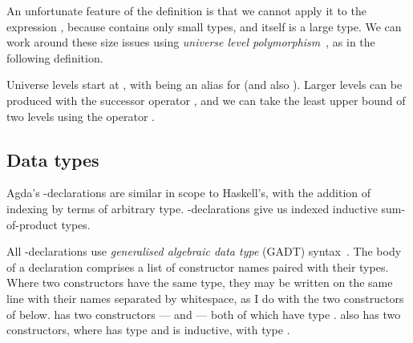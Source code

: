 
An unfortunate feature of the definition  is that we cannot
apply it to the expression , because 
contains only small types, and itself is a large type.
We can work around these size issues using
\emph{universe level polymorphism}~\citep{BCDE22},
as in the following definition.


Universe levels start at , with  being
an alias for \AgdaSpace{} (and also
).
Larger levels can be produced with the successor operator ,
and we can take the least upper bound of two levels using the operator
\AgdaPrimitive{\_$\sqcup$\_}.

\subsection{Data types}

Agda's -declarations are similar in scope to Haskell's, with
the addition of indexing by terms of arbitrary type.
-declarations give us indexed inductive sum-of-product types.

All -declarations use \emph{generalised algebraic data type}
(GADT) syntax~\citep{CH03,SP08,XCC03}.
The body of a declaration comprises a list of constructor names paired with
their types.
Where two constructors have the same type, they may be written on the same line
with their names separated by whitespace, as I do with the two constructors of
 below.
 has two constructors ---  and
 --- both of which have type
.
 also has two constructors, where
 has type  and
 is inductive, with type
\AgdaSpace{}\AgdaKeyword{$\to$}\AgdaSpace{}%
.

\noindent
\begin{minipage}[t]{0.5\textwidth}
\end{minipage}
\begin{minipage}[t]{0.5\textwidth}
\end{minipage}

